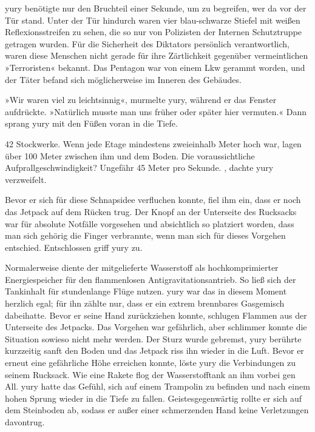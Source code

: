 yury benötigte nur den Bruchteil einer Sekunde, um zu begreifen, wer da vor der Tür stand. Unter der Tür hindurch waren vier blau-schwarze Stiefel mit weißen Reflexionsstreifen zu sehen, die so nur von Polizisten der Internen Schutztruppe getragen wurden. Für die Sicherheit des Diktators persönlich verantwortlich, waren diese Menschen nicht gerade für ihre Zärtlichkeit gegenüber vermeintlichen »Terroristen« bekannt. Das Pentagon war von einem Lkw gerammt worden, und der Täter befand sich möglicherweise im Inneren des Gebäudes.

»Wir waren viel zu leichtsinnig«, murmelte yury, während er das Fenster aufdrückte. »Natürlich musste man uns früher oder später hier vermuten.« Dann sprang yury mit den Füßen voran in die Tiefe.

42 Stockwerke. Wenn jede Etage mindestens zweieinhalb Meter hoch war, lagen über 100 Meter zwischen ihm und dem Boden. Die voraussichtliche Aufprallgeschwindigkeit? Ungefähr 45 Meter pro Sekunde. , dachte yury verzweifelt. 

Bevor er sich für diese Schnapsidee verfluchen konnte, fiel ihm ein, dass er noch das Jetpack auf dem Rücken trug. Der Knopf an der Unterseite des Rucksacks war für absolute Notfälle vorgesehen und absichtlich so platziert worden, dass man sich gehörig die Finger verbrannte, wenn man sich für dieses Vorgehen entschied. Entschlossen griff yury zu.

Normalerweise diente der mitgelieferte Wasserstoff als hochkomprimierter Energiespeicher für den flammenlosen Antigravitationsantrieb. So ließ sich der Tankinhalt für stundenlange Flüge nutzen. yury war das in diesem Moment herzlich egal; für ihn zählte nur, dass er ein extrem brennbares Gasgemisch dabeihatte. Bevor er seine Hand zurückziehen konnte, schlugen Flammen aus der Unterseite des Jetpacks. Das Vorgehen war gefährlich, aber schlimmer konnte die Situation sowieso nicht mehr werden. Der Sturz wurde gebremst, yury berührte kurzzeitig sanft den Boden und das Jetpack riss ihn wieder in die Luft. Bevor er erneut eine gefährliche Höhe erreichen konnte, löste yury die Verbindungen zu seinem Rucksack. Wie eine Rakete flog der Wasserstofftank an ihm vorbei gen All. yury hatte das Gefühl, sich auf einem Trampolin zu befinden und nach einem hohen Sprung wieder in die Tiefe zu fallen. Geistesgegenwärtig rollte er sich auf dem Steinboden ab, sodass er außer einer schmerzenden Hand keine Verletzungen davontrug.

